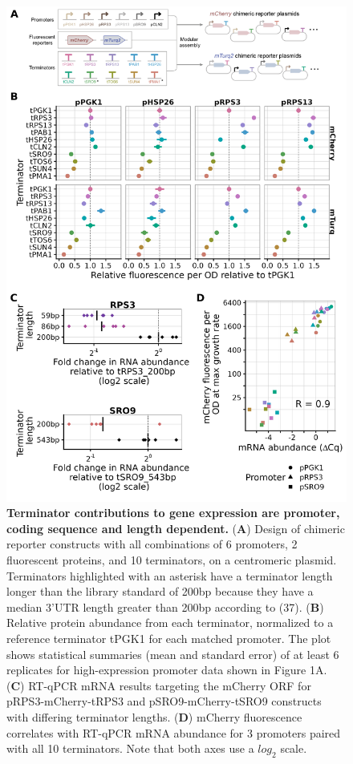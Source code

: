 \documentclass{SBCbookchapter}
\begin{document}
\begin{figure}[p]

{\centering \includegraphics[width=0.8\linewidth]{figures/pro_ter_swap_protein_and_norm_rna_exp_figure} 

}

\caption{\textbf{Terminator contributions to gene expression are promoter, coding sequence and length dependent.} (\textbf{A}) Design of chimeric reporter constructs with all combinations of 6 promoters, 2 fluorescent proteins, and 10 terminators, on a centromeric plasmid. Terminators highlighted with an asterisk have a terminator length longer than the library standard of 200bp because they have a median 3'UTR length greater than 200bp according to (37). (\textbf{B}) Relative protein abundance from each terminator, normalized to a reference terminator tPGK1 for each matched promoter. The plot shows statistical summaries (mean and standard error) of at least 6 replicates for high-expression promoter data shown in Figure 1A. (\textbf{C}) RT-qPCR mRNA results targeting the mCherry ORF for pRPS3-mCherry-tRPS3 and pSRO9-mCherry-tSRO9 constructs with differing terminator lengths. (\textbf{D}) mCherry fluorescence correlates with RT-qPCR mRNA abundance for 3 promoters paired with all 10 terminators. Note that both axes use a \(log_2\) scale.}\label{fig:pro-ter-platereader-mCherry-mTurq-norm}
\end{figure}
\end{document}
